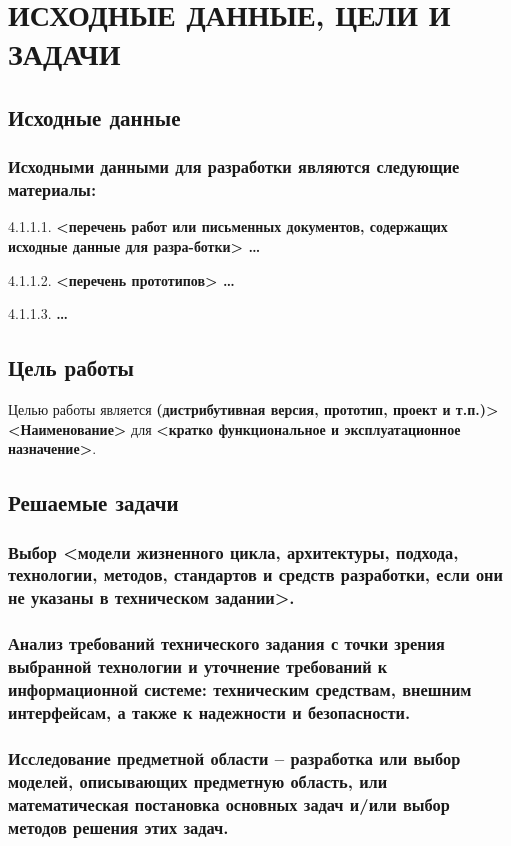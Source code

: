 \documentclass[utf8x, 12pt, oneside, a4paper]{article}
\begin{document}
	\section{ИСХОДНЫЕ ДАННЫЕ, ЦЕЛИ И ЗАДАЧИ}
	\subsection{Исходные данные} \label{4}
	\subsubsection{Исходными данными для разработки являются следующие материалы:}
	4.1.1.1. \textbf{<перечень работ или письменных документов, содержащих исходные данные для разра-ботки> …}

	4.1.1.2. \textbf{<перечень прототипов> …}

	4.1.1.3. \textbf{…}
	\subsection{Цель работы}
	Целью работы является \textbf{(дистрибутивная версия, прототип, проект и т.п.)>} \textbf{<Наименование>} для \textbf{<кратко функциональное и эксплуатационное назначение>}.

	\subsection{Решаемые задачи}
	\subsubsection{Выбор \textbf{<модели жизненного цикла, архитектуры, подхода, технологии, методов, стандартов и средств разработки, если они не указаны в техническом задании>}.}

	\subsubsection{\textbf{Анализ требований технического задания с точки зрения выбранной технологии и уточнение требований к информационной системе: техническим средствам, внешним интерфейсам, а также к надежности и безопасности.}}
	\hfill
	\subsubsection{\textbf{Исследование предметной области  – разработка или выбор моделей, описывающих предметную область, или математическая постановка основных задач и/или выбор методов решения этих задач.}}
\end{document}
